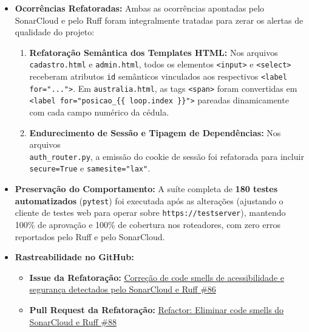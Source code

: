 \documentclass[12pt,a4paper]{article}
\begin{document}
\begin{itemize}
    \item \textbf{Ocorrências Refatoradas:} Ambas as ocorrências apontadas pelo SonarCloud e pelo Ruff foram integralmente tratadas para zerar os alertas de qualidade do projeto:
    \begin{enumerate}
        \item \textbf{Refatoração Semântica dos Templates HTML:} Nos arquivos \texttt{cadastro.html} e \texttt{admin.html}, todos os elementos \texttt{<input>} e \texttt{<select>} receberam atributos \texttt{id} semânticos vinculados aos respectivos \texttt{<label for="...">}. Em \texttt{australia.html}, as tags \texttt{<span>} foram convertidas em \texttt{<label for="posicao\_\{\{ loop.index \}\}">} pareadas dinamicamente com cada campo numérico da cédula.
        
        \item \textbf{Endurecimento de Sessão e Tipagem de Dependências:} Nos arquivos\\ \texttt{auth\_router.py}, a emissão do cookie de sessão foi refatorada para incluir \texttt{secure=True} e \texttt{samesite="lax"}.
    \end{enumerate}
    \item \textbf{Preservação do Comportamento:} A suíte completa de \textbf{180 testes automatizados} (\texttt{pytest}) foi executada após as alterações (ajustando o cliente de testes web para operar sobre \texttt{https://testserver}), mantendo 100\% de aprovação e 100\% de cobertura nos roteadores, com zero erros reportados pelo Ruff e pelo SonarCloud.
    \item \textbf{Rastreabilidade no GitHub:}
    \begin{itemize}
        \item \textbf{Issue da Refatoração:}
            \href{https://github.com/GiizAzul/MC656/issues/86}{Correção de code smells de acessibilidade e segurança detectados pelo SonarCloud e Ruff \#86}
        \item \textbf{Pull Request da Refatoração:} \href{https://github.com/GiizAzul/MC656/pull/88}{Refactor: Eliminar code smells do SonarCloud e Ruff \#88}
    \end{itemize}
\end{itemize}
\end{document}
